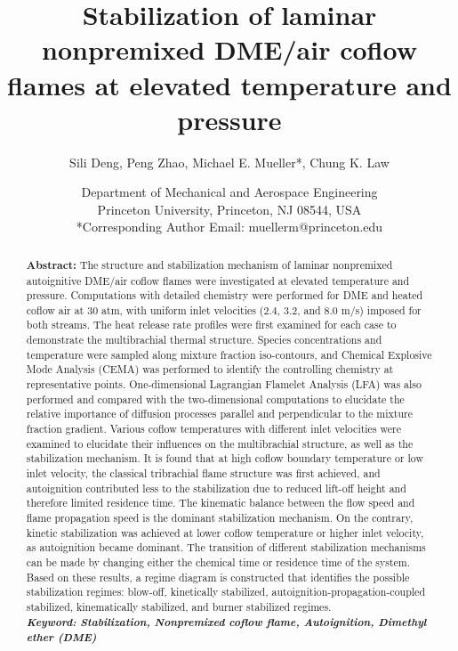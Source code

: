 \documentclass{wssci}
\begin{document}
\title{Stabilization of laminar nonpremixed DME/air coflow flames at elevated temperature and pressure}

\author{
%
Sili Deng, Peng Zhao, Michael E. Mueller*, Chung K. Law 
%
}
\date{
Department of Mechanical and Aerospace Engineering\\
Princeton University, Princeton, NJ 08544, USA\\
*Corresponding Author Email: muellerm@princeton.edu
%
}

\maketitle
\thispagestyle{fancyplain}

\begin{abstract}
\textbf{Abstract:} The structure and stabilization mechanism of laminar nonpremixed autoignitive DME/air coflow flames were investigated at elevated temperature and pressure. Computations with detailed chemistry were performed for DME and heated coflow air at $30$ atm, with uniform inlet velocities ($2.4$, $3.2$, and $8.0$ m/s) imposed for both streams.  The heat release rate profiles were first examined for each case to demonstrate the multibrachial thermal structure.  Species concentrations and temperature were sampled along mixture fraction iso-contours, and Chemical Explosive Mode Analysis (CEMA) was performed to identify the controlling chemistry at representative points.  One-dimensional Lagrangian Flamelet Analysis (LFA) was also performed and compared with the two-dimensional computations to elucidate the relative importance of diffusion processes parallel and perpendicular to the mixture fraction gradient.  Various coflow temperatures with different inlet velocities were examined to elucidate their influences on the multibrachial structure, as well as the stabilization mechanism.  It is found that at high coflow boundary temperature or low inlet velocity, the classical tribrachial flame structure was first achieved, and autoignition contributed less to the stabilization due to reduced lift-off height and therefore limited residence time.  The kinematic balance between the flow speed and flame propagation speed is the dominant stabilization mechanism.  On the contrary, kinetic stabilization was achieved at lower coflow temperature or higher inlet velocity, as autoignition became dominant.  The transition of different stabilization mechanisms can be made by changing either the chemical time or residence time of the system.  Based on these results, a regime diagram is constructed that identifies the possible stabilization regimes: blow-off, kinetically stabilized, autoignition-propagation-coupled stabilized, kinematically stabilized, and burner stabilized regimes.\\
\textbf{\textit{Keyword: Stabilization, Nonpremixed coflow flame, Autoignition, Dimethyl ether (DME)}}
\end{abstract}
\end{document}
